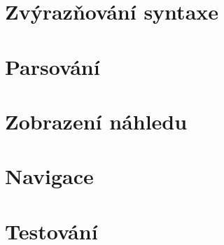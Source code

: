 \section{Zvýrazňování syntaxe}


\section{Parsování}


\section{Zobrazení náhledu}


\section{Navigace}


\section{Testování}

